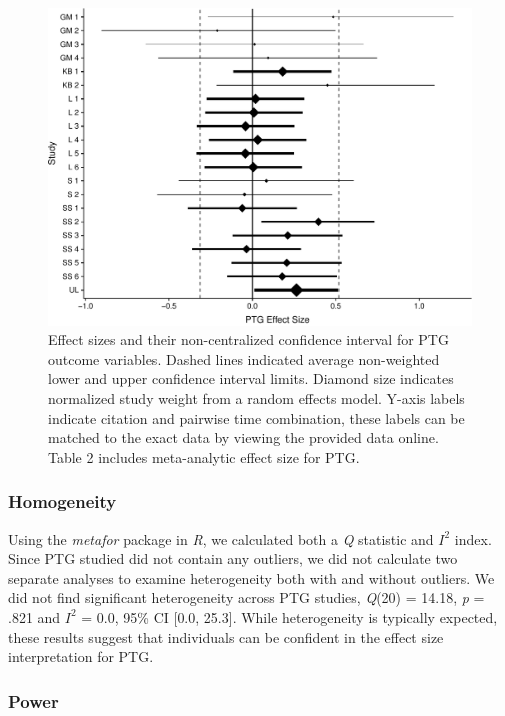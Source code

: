 \documentclass[,man]{apa6}
\begin{document}
\begin{figure}
\centering
\includegraphics{meta_markdown_files/figure-latex/ptgpic-1.pdf}
\caption{\label{fig:ptgpic}Effect sizes and their non-centralized confidence interval for PTG outcome variables. Dashed lines indicated average non-weighted lower and upper confidence interval limits. Diamond size indicates normalized study weight from a random effects model. Y-axis labels indicate citation and pairwise time combination, these labels can be matched to the exact data by viewing the provided data online. Table 2 includes meta-analytic effect size for PTG.}
\end{figure}

\hypertarget{homogeneity-1}{%
\subsubsection{Homogeneity}\label{homogeneity-1}}

Using the \emph{metafor} package in \emph{R}, we calculated both a \emph{Q} statistic and \(I^2\) index. Since PTG studied did not contain any outliers, we did not calculate two separate analyses to examine heterogeneity both with and without outliers. We did not find significant heterogeneity across PTG studies, \emph{Q}(20) = 14.18, \emph{p} = .821 and \(I^2\) = 0.0, 95\% CI {[}0.0, 25.3{]}. While heterogeneity is typically expected, these results suggest that individuals can be confident in the effect size interpretation for PTG.

\hypertarget{power-1}{%
\subsubsection{Power}\label{power-1}}
\end{document}
